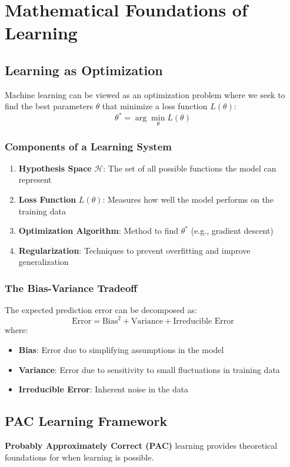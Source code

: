 \section{Mathematical Foundations of Learning}
\subsection{Learning as Optimization}
Machine learning can be viewed as an optimization problem where we seek to find the best parameters \(\theta\) that minimize a loss function \(L(\theta)\):
\[\theta^* = \arg\min_\theta L(\theta)\]

\subsubsection{Components of a Learning System}
\begin{enumerate}
    \item \textbf{Hypothesis Space} \(\mathcal{H}\): The set of all possible functions the model can represent
    \item \textbf{Loss Function} \(L(\theta)\): Measures how well the model performs on the training data
    \item \textbf{Optimization Algorithm}: Method to find \(\theta^*\) (e.g., gradient descent)
    \item \textbf{Regularization}: Techniques to prevent overfitting and improve generalization
\end{enumerate}

\subsubsection{The Bias-Variance Tradeoff}
The expected prediction error can be decomposed as:
\[\text{Error} = \text{Bias}^2 + \text{Variance} + \text{Irreducible Error}\]
where:
\begin{itemize}
    \item \textbf{Bias}: Error due to simplifying assumptions in the model
    \item \textbf{Variance}: Error due to sensitivity to small fluctuations in training data
    \item \textbf{Irreducible Error}: Inherent noise in the data
\end{itemize}

\subsection{PAC Learning Framework}
\textbf{Probably Approximately Correct (PAC)} learning provides theoretical foundations for when learning is possible.

